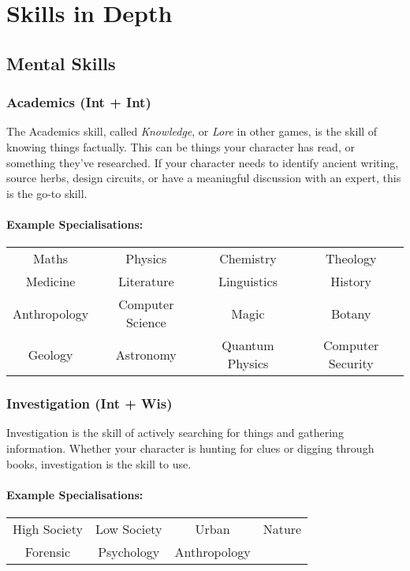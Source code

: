 \section{Skills in Depth}\label{sec:skills-in-depth}
\subsection{Mental Skills}
\subsubsection{Academics (Int + Int)}
The Academics skill, called \textit{Knowledge}, or \textit{Lore} in other games, is the skill of knowing things factually. 
This can be things your character has read, or something they've researched.
If your character needs to identify ancient writing, source herbs, design circuits, or have a meaningful discussion with an expert, this is the go-to skill.

\paragraph{Example Specialisations:}
\begin{center}
    \begin{tabular}{c|c|c|c}
        Maths & Physics & Chemistry & Theology \\
        Medicine & Literature & Linguistics & History \\
        Anthropology & Computer Science & Magic & Botany \\
        Geology & Astronomy & Quantum Physics & Computer Security \\
    \end{tabular}
\end{center}

\subsubsection{Investigation (Int + Wis)}
Investigation is the skill of actively searching for things and gathering information.
Whether your character is hunting for clues or digging through books, investigation is the skill to use.

\paragraph{Example Specialisations:}
\begin{center}
    \begin{tabular}{c|c|c|c}
        High Society & Low Society & Urban & Nature \\
        Forensic & Psychology & Anthropology  \\
    \end{tabular}
\end{center}

